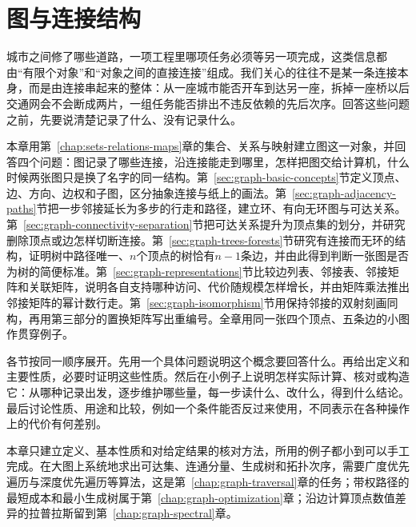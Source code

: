 \chapter{图与连接结构}
\label{chap:graph-objects}
\label{chap:graph-paths}

城市之间修了哪些道路，一项工程里哪项任务必须等另一项完成，这类信息都由“有限个对象”和“对象之间的直接连接”组成。我们关心的往往不是某一条连接本身，而是由连接串起来的整体：从一座城市能否开车到达另一座，拆掉一座桥以后交通网会不会断成两片，一组任务能否排出不违反依赖的先后次序。回答这些问题之前，先要说清楚记录了什么、没有记录什么。

本章用第~\ref{chap:sets-relations-maps}章的集合、关系与映射建立图这一对象，并回答四个问题：图记录了哪些连接，沿连接能走到哪里，怎样把图交给计算机，什么时候两张图只是换了名字的同一结构。第~\ref{sec:graph-basic-concepts}节定义顶点、边、方向、边权和子图，区分抽象连接与纸上的画法。第~\ref{sec:graph-adjacency-paths}节把一步邻接延长为多步的行走和路径，建立环、有向无环图与可达关系。第~\ref{sec:graph-connectivity-separation}节把可达关系提升为顶点集的划分，并研究删除顶点或边怎样切断连接。第~\ref{sec:graph-trees-forests}节研究有连接而无环的结构，证明树中路径唯一、$n$个顶点的树恰有$n-1$条边，并由此得到判断一张图是否为树的简便标准。第~\ref{sec:graph-representations}节比较边列表、邻接表、邻接矩阵和关联矩阵，说明各自支持哪种访问、代价随规模怎样增长，并由矩阵乘法推出邻接矩阵的幂计数行走。第~\ref{sec:graph-isomorphism}节用保持邻接的双射刻画同构，再用第三部分的置换矩阵写出重编号。全章用同一张四个顶点、五条边的小图作贯穿例子。

各节按同一顺序展开。先用一个具体问题说明这个概念要回答什么。再给出定义和主要性质，必要时证明这些性质。然后在小例子上说明怎样实际计算、核对或构造它：从哪种记录出发，逐步维护哪些量，每一步读什么、改什么，得到什么结论。最后讨论性质、用途和比较，例如一个条件能否反过来使用，不同表示在各种操作上的代价有何差别。

本章只建立定义、基本性质和对给定结果的核对方法，所用的例子都小到可以手工完成。在大图上系统地求出可达集、连通分量、生成树和拓扑次序，需要广度优先遍历与深度优先遍历等算法，这是第~\ref{chap:graph-traversal}章的任务；带权路径的最短成本和最小生成树属于第~\ref{chap:graph-optimization}章；沿边计算顶点数值差异的拉普拉斯留到第~\ref{chap:graph-spectral}章。








